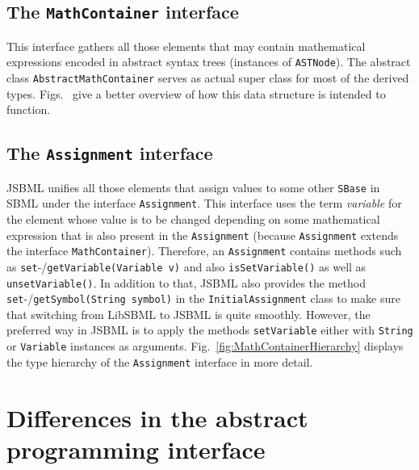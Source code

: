 \documentclass[
  BCOR12mm,
  letterpaper,
  11pt,
  headsepline,
  pointlessnumbers,
  tablecaptionabove,
  onelinecaption,
  headinclude,
  appendixprefix,
  idxtotoc,
  bibtotoc,
  twoside,
  titlepage
]{scrartcl}
\begin{document}
\subsection{The \texttt{MathContainer} interface}

This interface gathers all those elements that may contain mathematical
expressions encoded in abstract syntax trees (instances of
\texttt{ASTNode}).
The abstract class \texttt{AbstractMathContainer} serves as actual super class
for most of the derived types. Figs.~ give a better overview of how this data structure
is intended to function.


\subsection{The \texttt{Assignment} interface}

JSBML unifies all those elements that assign values to some other
\texttt{SBase} in SBML \citep{M.Hucka03012003} under the interface \texttt{Assignment}. This interface
uses the term \emph{variable} for the element whose value is to be changed depending on some mathematical expression that is also present in the \texttt{Assignment}
(because \texttt{Assignment} extends the interface \texttt{MathContainer}). Therefore,
an \texttt{Assignment} contains methods such as \texttt{set}-/\texttt{getVariable(Variable v)} and also \texttt{isSetVariable()} as well as
\texttt{unsetVariable()}. In addition to that, JSBML also provides the method \texttt{set}-/\texttt{getSymbol(String symbol)} in the \texttt{InitialAssignment}
class to make sure that switching from LibSBML to JSBML is quite smoothly.
However, the preferred way in JSBML is to apply the methods
\texttt{setVariable} either with \texttt{String}
 or \texttt{Variable} instances as arguments.
Fig.~\vref{fig:MathContainerHierarchy} displays the type hierarchy of the
\texttt{Assignment} interface in more detail.


\section{Differences in the abstract programming interface}
\end{document}
